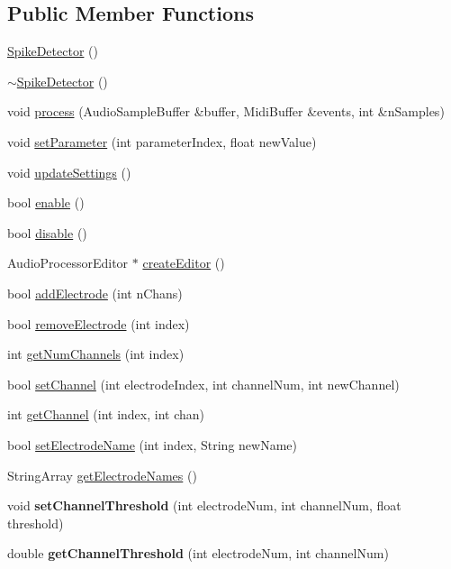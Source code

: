 \subsection*{Public Member Functions}
\begin{DoxyCompactItemize}
\item 
\hyperlink{classSpikeDetector_a3e3101762b27b1df8be6e8fd1a0bca22}{Spike\-Detector} ()
\item 
\hyperlink{classSpikeDetector_a1cd55b8cabe87b211d7f077ea3003a65}{$\sim$\-Spike\-Detector} ()
\item 
void \hyperlink{classSpikeDetector_a9ba352094475b7be33ca36ae918492d1}{process} (Audio\-Sample\-Buffer \&buffer, Midi\-Buffer \&events, int \&n\-Samples)
\item 
void \hyperlink{classSpikeDetector_a679f5e087dfb959d61f3dd9cdf364cf2}{set\-Parameter} (int parameter\-Index, float new\-Value)
\item 
void \hyperlink{classSpikeDetector_a3c764b20638e3cd2245cab442ce434ca}{update\-Settings} ()
\item 
bool \hyperlink{classSpikeDetector_a50b98fa352359b8dec78b21356c9acbb}{enable} ()
\item 
bool \hyperlink{classSpikeDetector_aeaaac10f4059ee1cdabcff58d24b5f52}{disable} ()
\item 
Audio\-Processor\-Editor $\ast$ \hyperlink{classSpikeDetector_af96da67cfafdba1e59b7eb88b3ed0de6}{create\-Editor} ()
\item 
bool \hyperlink{classSpikeDetector_a59b4ac520a1831ecd5e02df4a58e6735}{add\-Electrode} (int n\-Chans)
\item 
bool \hyperlink{classSpikeDetector_ae05d17ef7b8706a370d4d7e049cec877}{remove\-Electrode} (int index)
\item 
int \hyperlink{classSpikeDetector_a2e5115a6d0508a3476601856eab7ebbe}{get\-Num\-Channels} (int index)
\item 
bool \hyperlink{classSpikeDetector_a44be956ab12ff6a6d69ad90dd732ad51}{set\-Channel} (int electrode\-Index, int channel\-Num, int new\-Channel)
\item 
int \hyperlink{classSpikeDetector_ad43da7a9241a36b6d04c99c6821752d9}{get\-Channel} (int index, int chan)
\item 
bool \hyperlink{classSpikeDetector_a41023a894e0d32db949a823b469eb4d6}{set\-Electrode\-Name} (int index, String new\-Name)
\item 
String\-Array \hyperlink{classSpikeDetector_a6acb52a82fec95ad7b44cf2584fcdc0d}{get\-Electrode\-Names} ()
\item 
\hypertarget{classSpikeDetector_a6fc7b97799e3c1d6d4841d489b8bc854}{void {\bfseries set\-Channel\-Threshold} (int electrode\-Num, int channel\-Num, float threshold)}\label{classSpikeDetector_a6fc7b97799e3c1d6d4841d489b8bc854}

\item 
\hypertarget{classSpikeDetector_aa00bc3a6b29da73fdc75517579289b13}{double {\bfseries get\-Channel\-Threshold} (int electrode\-Num, int channel\-Num)}\label{classSpikeDetector_aa00bc3a6b29da73fdc75517579289b13}

\end{DoxyCompactItemize}

